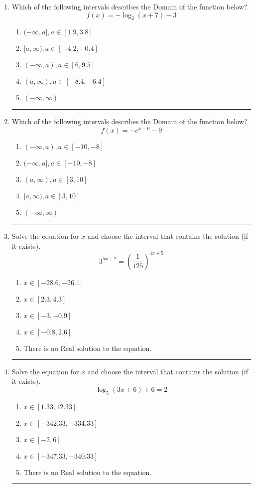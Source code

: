 \documentclass[14pt]{extbook}
\newcommand{\litem}[1]{\item#1\hspace*{-1cm}\rule{\textwidth}{0.4pt}}
\begin{document}
\begin{enumerate}
{\begin{enumerate}[label=\Alph*.]
\end{enumerate} }
\litem{
Which of the following intervals describes the Domain of the function below?\[ f(x) = -\log_2{(x+7)}-3 \]\begin{enumerate}[label=\Alph*.]
\item \( (-\infty, a], a \in [1.9, 3.8] \)
\item \( [a, \infty), a \in [-4.2, -0.4] \)
\item \( (-\infty, a), a \in [6, 9.5] \)
\item \( (a, \infty), a \in [-8.4, -6.4] \)
\item \( (-\infty, \infty) \)

\end{enumerate} }
\litem{
Which of the following intervals describes the Domain of the function below?\[ f(x) = -e^{x-6}-9 \]\begin{enumerate}[label=\Alph*.]
\item \( (-\infty, a), a \in [-10, -8] \)
\item \( (-\infty, a], a \in [-10, -8] \)
\item \( (a, \infty), a \in [3, 10] \)
\item \( [a, \infty), a \in [3, 10] \)
\item \( (-\infty, \infty) \)

\end{enumerate} }
\litem{
Solve the equation for $x$ and choose the interval that contains the solution (if it exists).\[ 3^{5x+2} = \left(\frac{1}{125}\right)^{4x+5} \]\begin{enumerate}[label=\Alph*.]
\item \( x \in [-28.6, -26.1] \)
\item \( x \in [2.3, 4.3] \)
\item \( x \in [-3, -0.9] \)
\item \( x \in [-0.8, 2.6] \)
\item \( \text{There is no Real solution to the equation.} \)

\end{enumerate} }
\litem{
Solve the equation for $x$ and choose the interval that contains the solution (if it exists).\[ \log_{5}{(3x+6)}+6 = 2 \]\begin{enumerate}[label=\Alph*.]
\item \( x \in [1.33, 12.33] \)
\item \( x \in [-342.33, -334.33] \)
\item \( x \in [-2, 6] \)
\item \( x \in [-347.33, -340.33] \)
\item \( \text{There is no Real solution to the equation.} \)


\end{enumerate}}
\end{enumerate}
\end{document}
